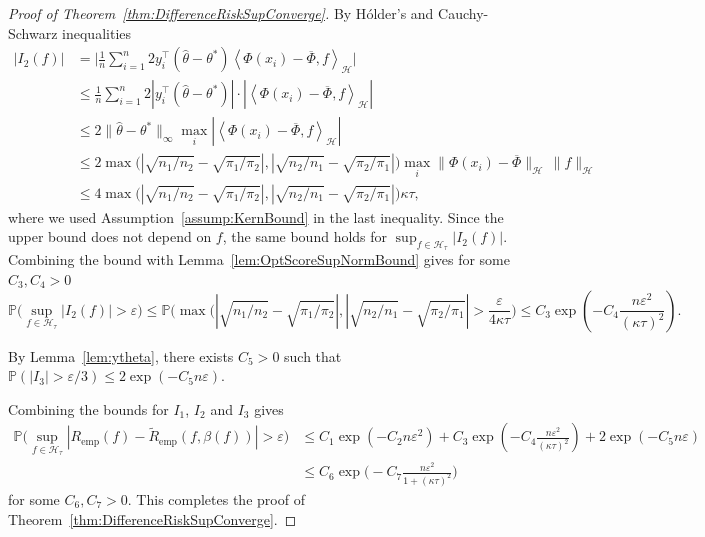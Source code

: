 \documentclass[twoside, onecolumn]{article}
\def\varep{\varepsilon}
\def\Hcal{\mathcal{H}}
\def\Hcal{\mathcal{H}}
\begin{document}
\begin{proof}[Proof of Theorem~\ref{thm:DifferenceRiskSupConverge}]
By H{\'o}lder's and Cauchy-Schwarz inequalities
\begin{align*}
|I_2(f)|&=
\bigg|\frac{1}{n}\sum_{i=1}^{n}2y_i^{\top}(\widehat \theta-\theta^*)\left<\Phi(x_i)-\overline{\Phi},f\right>_\Hcal\bigg|\\
&\leq\frac{1}{n}\sum_{i=1}^{n} 2|y_i^{\top}(\widehat \theta-\theta^*)|\cdot|\left<\Phi(x_i)-\overline{\Phi},f\right>_\Hcal|\\
&\leq 2 \|\widehat \theta-\theta^*\|_{\infty}\max_i|\left<\Phi(x_i)-\overline{\Phi},f\right>_\Hcal|\\
&\leq 2 \max\Big(|\sqrt{n_1/n_2}-\sqrt{\pi_1/\pi_2}|,|\sqrt{n_2/n_1}-\sqrt{\pi_2/\pi_1}|\Big)\max_i\|\Phi(x_i)-\overline{\Phi}\|_{\mathcal{H}}\,\|f\|_{\mathcal{H}}\\
&\leq 4\max\Big(|\sqrt{n_1/n_2}-\sqrt{\pi_1/\pi_2}|,|\sqrt{n_2/n_1}-\sqrt{\pi_2/\pi_1}|\Big)  \kappa\tau,
\end{align*}
where we used Assumption~\ref{assump:KernBound} in the last inequality. Since the upper bound does not depend on $f$, the same bound holds for $\sup_{f\in\Hcal_{\tau}}|I_2(f)|$. Combining the bound with Lemma~\ref{lem:OptScoreSupNormBound} gives for some $C_3, C_4>0$
$$
\mathbb{P}\Big(\sup_{f\in\Hcal_{\tau}}|I_2(f)|>\varep\Big)\leq
\mathbb{P}\bigg(\max\Big(|\sqrt{n_1/n_2}-\sqrt{\pi_1/\pi_2}|,|\sqrt{n_2/n_1}-\sqrt{\pi_2/\pi_1}|>\frac{\varep}{4\kappa \tau}\Big) 
\leq C_3\exp(-C_4 \frac{n \varepsilon^2}{(\kappa\tau)^2}).
$$



By Lemma~\ref{lem:ytheta}, there exists $C_5>0$ such that $\mathbb{P}(|I_3|>\varep/3)\leq 2 \exp(-C_5 n \varep)$.

Combining the bounds for $I_1$, $I_2$ and $I_3$ gives
\begin{align*}
\mathbb{P}\big(\sup_{f\in \Hcal_{\tau}}| R_{\text{emp}}(f)-\widetilde{R}_{\text{emp}}(f, \beta(f))|>\varep\Big)
&\leq C_1\exp(-C_2 n \varepsilon^2)+C_3\exp(-C_4 \frac{n \varepsilon^2}{(\kappa\tau)^2})+2 \exp(-C_5 n \varep)\\
&\leq C_6\exp\Big(-C_7 \frac{n \varepsilon^2}{1 + (\kappa\tau)^2}\Big)
\end{align*}
for some $C_6, C_7>0$. This completes the proof of Theorem~\ref{thm:DifferenceRiskSupConverge}.
\end{proof}
\end{document}
